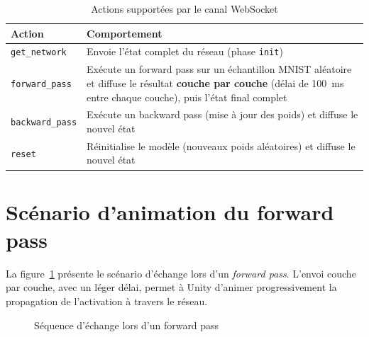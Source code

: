 \documentclass[12pt,a4paper]{report}
\begin{document}
\begin{table}[h!]
\centering
\begin{tabular}{lp{9cm}}
\toprule
\textbf{Action} & \textbf{Comportement} \\
\midrule
\texttt{get\_network} & Envoie l'\'etat complet du r\'eseau (phase \texttt{init}) \\
\texttt{forward\_pass} & Ex\'ecute un forward pass sur un \'echantillon MNIST
al\'eatoire et diffuse le r\'esultat \textbf{couche par couche} (d\'elai de
100~ms entre chaque couche), puis l'\'etat final complet \\
\texttt{backward\_pass} & Ex\'ecute un backward pass (mise \`a jour des
poids) et diffuse le nouvel \'etat \\
\texttt{reset} & R\'einitialise le mod\`ele (nouveaux poids al\'eatoires) et
diffuse le nouvel \'etat \\
\bottomrule
\end{tabular}
\caption{Actions support\'ees par le canal WebSocket}
\end{table}

\section{Sc\'enario d'animation du forward pass}

La figure~\ref{fig:sequence} pr\'esente le sc\'enario d'\'echange lors d'un
\textit{forward pass}. L'envoi couche par couche, avec un l\'eger d\'elai,
permet \`a Unity d'animer progressivement la propagation de l'activation \`a
travers le r\'eseau.

\begin{figure}[h!]
\centering
{}
\caption{S\'equence d'\'echange lors d'un forward pass}
\label{fig:sequence}
\end{figure}
\end{document}

